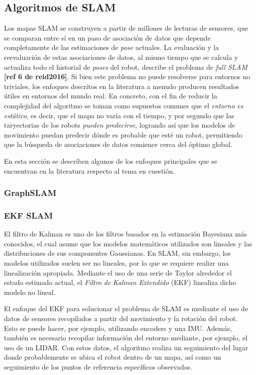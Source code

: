 \subsection{Algoritmos de SLAM}
Los mapas SLAM se construyen a partir de millones de lecturas de sensores, que se comparan entre sí en un paso de asociación de datos que depende completamente de las estimaciones de \textit{pose} actuales. La evaluación y la reevaluación de estas asociaciones de datos, al mismo tiempo que se calcula y actualiza todo el historial de \textit{poses} del robot, describe el problema de \textit{full SLAM} \textbf{[ref 6 de reid2016]}. Si bien este problema no puede resolverse para entornos no triviales, los enfoques descritos en la literatura a menudo producen resultados útiles en entornos del mundo real. En concreto, con el fin de reducir la complejidad del algoritmo se toman como supuestos comunes que el \textit{entorno es estático}, es decir, que el mapa no varía con el tiempo, y por segundo que las taryectorias de los robots \textit{pueden predecirse}, logrando así que los modelos de movimiento puedan predecir dónde es probable que esté un robot, permitiendo que la búsqueda de asociaciones de datos comience cerca del óptimo global.

En esta sección se describen algunos de los enfoques principales que se encuentran en la literatura respecto al tema en cuestión.

\subsubsection{GraphSLAM}

\subsubsection{EKF SLAM}
El filtro de Kalman es uno de los filtros basados en la estimación Bayesiana más conocidos, el cual asume que los modelos matemáticos utilizados son lineales y las distribuciones de sus componentes Gaussianas. En SLAM, sin embargo, los modelos utilizados suelen ser no lineales, por lo que se requiere realizr una linealización apropiada. Mediante el uso de una serie de Taylor alrededor el estado estimado actual, el \textit{Filtro de Kalman Extendido} (EKF) linealiza dicho modelo no lineal.

El enfoque del EKF para solucionar el problema de SLAM es mediante el uso de datos de sensores recopilados a partir del movimiento y la rotación del robot. Esto se puede hacer, por ejemplo, utilizando encoders y una IMU. Además, también es necesario recopilar información del entorno mediante, por ejemplo, el uso de un LIDAR. Con estos datos, el algoritmo realiza un seguimiento del lugar donde probablemente se ubica el robot dentro de un mapa, así como un seguimiento de los puntos de referencia específicos observados.

